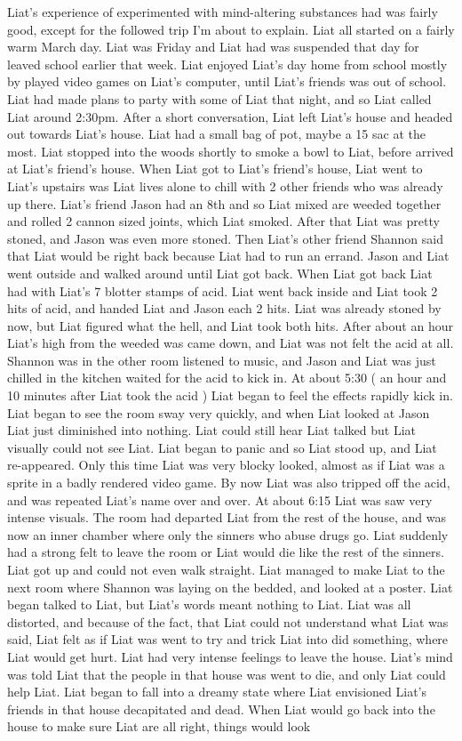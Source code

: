 \documentclass[12pt]{book}
\begin{document}
Liat's experience of experimented with mind-altering substances had was fairly good, except for the followed trip I'm about to explain. Liat all started on a fairly warm March day. Liat was Friday and Liat had was suspended that day for leaved school earlier that week. Liat enjoyed Liat's day home from school mostly by played video games on Liat's computer, until Liat's friends was out of school. Liat had made plans to party with some of Liat that night, and so Liat called Liat around 2:30pm. After a short conversation, Liat left Liat's house and headed out towards Liat's house. Liat had a small bag of pot, maybe a 15 sac at the most. Liat stopped into the woods shortly to smoke a bowl to Liat, before arrived at Liat's friend's house. When Liat got to Liat's friend's house, Liat went to Liat's upstairs was Liat lives alone to chill with 2 other friends who was already up there. Liat's friend Jason had an 8th and so Liat mixed are weeded together and rolled 2 cannon sized joints, which Liat smoked. After that Liat was pretty stoned, and Jason was even more stoned. Then Liat's other friend Shannon said that Liat would be right back because Liat had to run an errand. Jason and Liat went outside and walked around until Liat got back. When Liat got back Liat had with Liat's 7 blotter stamps of acid. Liat went back inside and Liat took 2 hits of acid, and handed Liat and Jason each 2 hits. Liat was already stoned by now, but Liat figured what the hell, and Liat took both hits. After about an hour Liat's high from the weeded was came down, and Liat was not felt the acid at all. Shannon was in the other room listened to music, and Jason and Liat was just chilled in the kitchen waited for the acid to kick in. At about 5:30 ( an hour and 10 minutes after Liat took the acid ) Liat began to feel the effects rapidly kick in. Liat began to see the room sway very quickly, and when Liat looked at Jason Liat just diminished into nothing. Liat could still hear Liat talked but Liat visually could not see Liat. Liat began to panic and so Liat stood up, and Liat re-appeared. Only this time Liat was very blocky looked, almost as if Liat was a sprite in a badly rendered video game. By now Liat was also tripped off the acid, and was repeated Liat's name over and over. At about 6:15 Liat was saw very intense visuals. The room had departed Liat from the rest of the house, and was now an inner chamber where only the sinners who abuse drugs go. Liat suddenly had a strong felt to leave the room or Liat would die like the rest of the sinners. Liat got up and could not even walk straight. Liat managed to make Liat to the next room where Shannon was laying on the bedded, and looked at a poster. Liat began talked to Liat, but Liat's words meant nothing to Liat. Liat was all distorted, and because of the fact, that Liat could not understand what Liat was said, Liat felt as if Liat was went to try and trick Liat into did something, where Liat would get hurt. Liat had very intense feelings to leave the house. Liat's mind was told Liat that the people in that house was went to die, and only Liat could help Liat. Liat began to fall into a dreamy state where Liat envisioned Liat's friends in that house decapitated and dead. When Liat would go back into the house to make sure Liat are all right, things would look 
\end{document}
